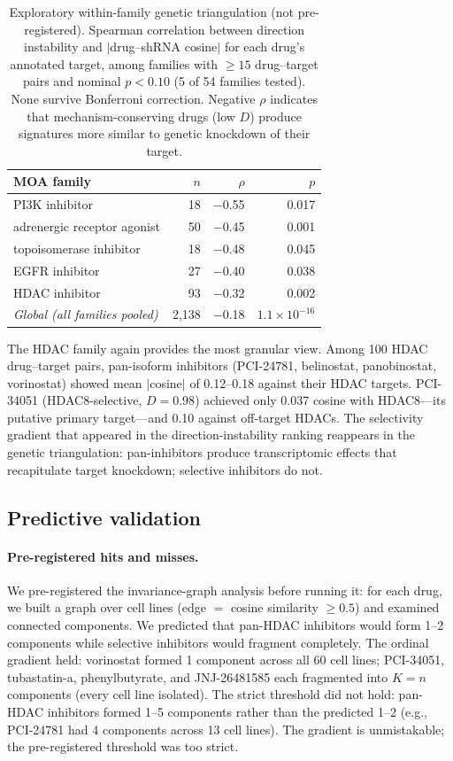 \documentclass{article}
\begin{document}
\begin{table}[t]
\centering
\caption{Exploratory within-family genetic triangulation (not
pre-registered). Spearman correlation between direction instability and
$|$drug--shRNA cosine$|$ for each drug's annotated target, among families
with $\geq 15$ drug--target pairs and nominal $p < 0.10$ (5 of 54 families
tested). None survive Bonferroni correction. Negative $\rho$ indicates that
mechanism-conserving drugs (low $D$) produce signatures more similar to
genetic knockdown of their target.}
\label{tab:triangulation}
\small
\begin{tabular}{lrrr}
\toprule
MOA family & $n$ & $\rho$ & $p$ \\
\midrule
PI3K inhibitor & 18 & $-$0.55 & 0.017 \\
adrenergic receptor agonist & 50 & $-$0.45 & 0.001 \\
topoisomerase inhibitor & 18 & $-$0.48 & 0.045 \\
EGFR inhibitor & 27 & $-$0.40 & 0.038 \\
HDAC inhibitor & 93 & $-$0.32 & 0.002 \\
\midrule
\emph{Global (all families pooled)} & 2{,}138 & $-$0.18 & $1.1 \times 10^{-16}$ \\
\bottomrule
\end{tabular}
\end{table}

The HDAC family again provides the most granular view. Among 100 HDAC
drug--target pairs, pan-isoform inhibitors (PCI-24781, belinostat,
panobinostat, vorinostat) showed mean $|$cosine$|$ of 0.12--0.18 against
their HDAC targets. PCI-34051 (HDAC8-selective, $D = 0.98$) achieved only
0.037 cosine with HDAC8---its putative primary target---and 0.10 against
off-target HDACs. The selectivity gradient that appeared in the
direction-instability ranking reappears in the genetic triangulation:
pan-inhibitors produce transcriptomic effects that recapitulate target
knockdown; selective inhibitors do not.

\subsection{Predictive validation}

\paragraph{Pre-registered hits and misses.}

We pre-registered the invariance-graph analysis before running it: for
each drug, we built a graph over cell lines (edge $=$ cosine similarity
$\geq 0.5$) and examined connected components. We predicted that
pan-HDAC inhibitors would form 1--2 components while selective
inhibitors would fragment completely. The ordinal gradient held:
vorinostat formed 1 component across all 60 cell lines; PCI-34051,
tubastatin-a, phenylbutyrate, and JNJ-26481585 each fragmented into
$K = n$ components (every cell line isolated). The strict threshold
did not hold: pan-HDAC inhibitors formed 1--5 components rather
than the predicted 1--2 (e.g., PCI-24781 had 4 components across
13 cell lines). The gradient is unmistakable; the pre-registered
threshold was too strict.
\end{document}
